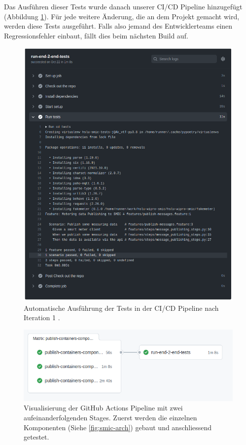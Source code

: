 Das Ausführen dieser Tests wurde danach unserer \ac{CI/CD} Pipeline hinzugefügt (Abbildung \ref{fig:test-iteration-1}).
Für jede weitere Änderung, die an dem Projekt gemacht wird, werden diese Tests ausgeführt.
Falls also jemand des Entwicklerteams einen Regressionsfehler einbaut, fällt dies beim nächsten Build auf.

\begin{figure}[H]
    \centering
    \includegraphics[width=1.0\textwidth]{gfx/testlog-iteration-0}
    \caption{
        Automatische Ausführung der Tests in der \ac{CI/CD} Pipeline nach Iteration 1 \parencite{randombenj_testlog_it_0_2021}.
    }
    \label{fig:test-iteration-1}
\end{figure}

\begin{figure}[H]
    \centering
    \includegraphics[width=1.0\textwidth]{gfx/ci-env}
    \caption{
        Visualisierung der GitHub Actions Pipeline mit zwei aufeinanderfolgenden Stages.
        Zuerst werden die einzelnen Komponenten (Siehe \ref{fig:smic-arch}) gebaut und
        anschliessend getestet.
    }
    \label{fig:ci-env}
\end{figure}

